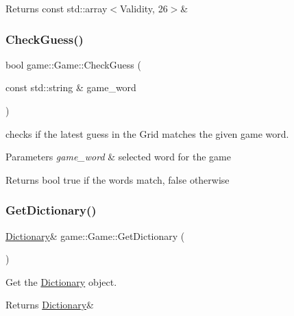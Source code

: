 \begin{DoxyReturn}{Returns}
const std\+::array$<$\+Validity, 26$>$\& 
\end{DoxyReturn}
\mbox{\label{classgame_1_1Game_a73e4f12d9ffbf48573d3e9871a15fd8e}} 
\subsubsection{\texorpdfstring{Check\+Guess()}{CheckGuess()}}
{\footnotesize\ttfamily bool game\+::\+Game\+::\+Check\+Guess (\begin{DoxyParamCaption}\item[{const std\+::string \&}]{game\+\_\+word }\end{DoxyParamCaption})}



checks if the latest guess in the Grid matches the given game word. 


\begin{DoxyParams}{Parameters}
{\em game\+\_\+word} & selected word for the game \\
\hline
\end{DoxyParams}
\begin{DoxyReturn}{Returns}
bool true if the words match, false otherwise 
\end{DoxyReturn}
\mbox{\label{classgame_1_1Game_a59a7ae6a629f360d6aa7c9b74a33125b}} 
\subsubsection{\texorpdfstring{Get\+Dictionary()}{GetDictionary()}}
{\footnotesize\ttfamily \hyperlink{classgame_1_1Dictionary}{Dictionary}\& game\+::\+Game\+::\+Get\+Dictionary (\begin{DoxyParamCaption}{ }\end{DoxyParamCaption})}



Get the \hyperlink{classgame_1_1Dictionary}{Dictionary} object. 

\begin{DoxyReturn}{Returns}
\hyperlink{classgame_1_1Dictionary}{Dictionary}\& 
\end{DoxyReturn}
\mbox{\label{classgame_1_1Game_a92368c63688b94a1b67f7fefb3449e9e}} 
